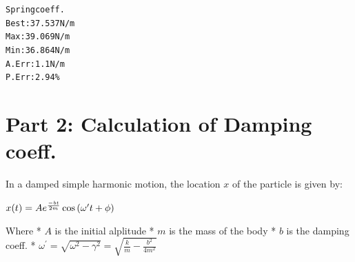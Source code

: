 \documentclass[letterpaper,10pt,english]{/usr/share/sphinx/texinputs/sphinxhowto}
\newenvironment{InvisibleVerbatim}
        {\begin{mdframed}[leftmargin=0.1\linewidth,innerleftmargin=3pt,innerrightmargin=3pt, userdefinedwidth=1\linewidth, linewidth=0pt, linecolor=white, usetwoside=false]}
        {\end{mdframed}}
\begin{document}
    

        
        

            
                \begin{InvisibleVerbatim}
                \vspace{-0.5\baselineskip}
\begin{alltt}Spring coeff.
Best:   37.537 N/m
Max:    39.069 N/m
Min:    36.864 N/m
A. Err: 1.1 N/m
P. Err: 2.94\%
\end{alltt}

            \end{InvisibleVerbatim}
            
        
    
\section{Part 2: Calculation of Damping
coeff.}\label{part-2-calculation-of-damping-coeff.}

In a damped simple harmonic motion, the location $x$ of the particle is
given by:

$\large  x(t) = Ae^{\frac{-bt}{2m}}\cos{(\omega^\prime t + \phi)}$

Where * $A$ is the initial alplitude * $m$ is the mass of the body * $b$
is the damping coeff. *
$\displaystyle\omega^\prime = \sqrt{\omega^2 - \gamma^2} = \sqrt{\frac{k}{m} - \frac{b^2}{4m^2}}$

\end{document}
